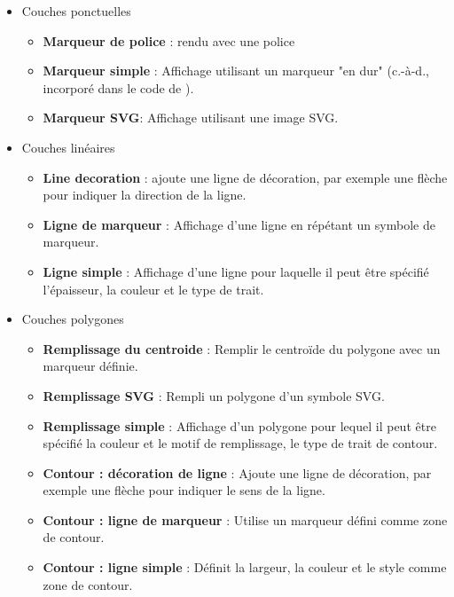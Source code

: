\label{symboltypes}

\begin{itemize}[label=--]
\item Couches ponctuelles
\begin{itemize}[label=--]
\item \textbf{Marqueur de police} : rendu avec une police
\item \textbf{Marqueur simple} : Affichage utilisant un marqueur "en dur" (c.-à-d., 
incorporé dans le code de \qg).
\item \textbf{Marqueur SVG}: Affichage utilisant une image SVG.
\end{itemize}
\item Couches linéaires
\begin{itemize}[label=--]
\item \textbf{Line decoration} : ajoute une ligne de décoration, par exemple une flèche 
pour indiquer la direction de la ligne.
\item \textbf{Ligne de marqueur} : Affichage d'une ligne en répétant un symbole de marqueur.
\item \textbf{Ligne simple} : Affichage d'une ligne pour laquelle il peut être spécifié l'épaisseur, 
la couleur et le type de trait.
\end{itemize}
\item Couches polygones
\begin{itemize}[label=--]
\item \textbf{Remplissage du centroide} : Remplir le centroïde du polygone avec un marqueur définie.
\item \textbf{Remplissage SVG} : Rempli un polygone d'un symbole SVG.
\item \textbf{Remplissage simple} : Affichage d'un polygone pour lequel il peut être spécifié la 
couleur et le motif de remplissage, le type de trait de contour.
\item \textbf{Contour : décoration de ligne} : Ajoute une ligne de décoration, par exemple une 
flèche pour indiquer le sens de la ligne.
\item \textbf{Contour : ligne de marqueur} : Utilise un marqueur défini comme zone de contour.
\item \textbf{Contour : ligne simple} : Définit la largeur, la couleur et le style comme zone 
de contour.
\end{itemize}
\end{itemize}



